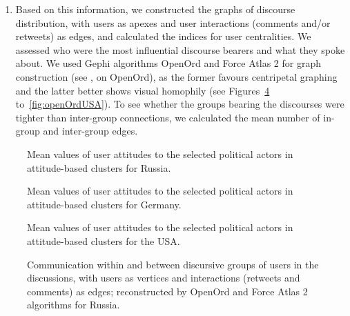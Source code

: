 \begin{enumerate}
	\item Based on this information, we constructed the graphs of discourse distribution, with users as apexes and user interactions (comments and/or retweets) as edges, and calculated the indices for user centralities. We assessed who were the most influential discourse bearers and what they spoke about. We used Gephi algorithms OpenOrd and Force Atlas 2 for graph construction (see \cite{MartinBrownKlavans}, on OpenOrd), as the former favours centripetal graphing and the latter better shows visual homophily (see Figures~\cref{fig:openOrdRussia} to~\cref{fig:openOrdUSA}). To see whether the groups bearing the discourses were tighter than inter-group connections, we calculated the mean number of in-group and inter-group edges.
\end{enumerate}

\begin{figure}[ht]
	\caption{Mean values of user attitudes to the selected political actors in attitude-based clusters for Russia.}\label{fig:userAttitudesRussia}
\end{figure}

\begin{figure}[ht]
	\caption{Mean values of user attitudes to the selected political actors in attitude-based clusters for Germany.}\label{fig:userAttitudesGermany}
\end{figure}

\begin{figure}[ht]
	\caption{Mean values of user attitudes to the selected political actors in attitude-based clusters for the USA.}\label{fig:userAttitudesUSA}
\end{figure}

\begin{figure}[ht]
	\caption{Communication within and between discursive groups of users in the discussions, with users as vertices and interactions (retweets and comments) as edges; reconstructed by OpenOrd and Force Atlas 2 algorithms for Russia.}\label{fig:openOrdRussia}
\end{figure}

